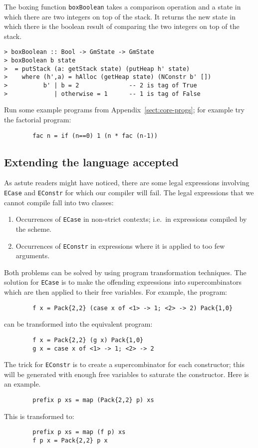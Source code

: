The boxing function \mbox{\tt boxBoolean} takes a comparison operation and a
state in which there are two integers on top of the stack. It returns
the new state in which there is the boolean result of comparing the
two integers on top of the stack.
\begin{verbatim}
> boxBoolean :: Bool -> GmState -> GmState
> boxBoolean b state
>  = putStack (a: getStack state) (putHeap h' state)
>    where (h',a) = hAlloc (getHeap state) (NConstr b' [])
>          b' | b = 2              -- 2 is tag of True
>             | otherwise = 1      -- 1 is tag of False
\end{verbatim}
%
%
\begin{exercise}\label{gm:X:fac6}
Run some example programs from Appendix~\ref{sect:core-progs}; for
example try the factorial program:
\begin{verbatim}
        fac n = if (n==0) 1 (n * fac (n-1))
\end{verbatim}
\end{exercise}

\subsection{Extending the language accepted}

As astute readers might have noticed, there are some legal expressions
involving \mbox{\tt ECase} and \mbox{\tt EConstr} for which our compiler will fail. The
legal expressions that we cannot compile fall into two classes:
\begin{enumerate}
\item Occurrences of \mbox{\tt ECase} in non-strict contexts; i.e.\ in
expressions compiled by the \tC{} scheme.

\item Occurrences of \mbox{\tt EConstr} in expressions where it is applied to
too few arguments.
\end{enumerate}
Both problems can be solved by using program transformation
techniques. The solution for \mbox{\tt ECase} is to make the offending
expressions into supercombinators which are then applied to their free
variables. For example, the program:
\begin{verbatim}
        f x = Pack{2,2} (case x of <1> -> 1; <2> -> 2) Pack{1,0}
\end{verbatim}
can be transformed into the equivalent program:
\begin{verbatim}
        f x = Pack{2,2} (g x) Pack{1,0}
        g x = case x of <1> -> 1; <2> -> 2
\end{verbatim}
The trick for \mbox{\tt EConstr} is to create a supercombinator for each
constructor; this will be generated with enough free variables to
saturate the constructor. Here is an example.
\begin{verbatim}
        prefix p xs = map (Pack{2,2} p) xs
\end{verbatim}
This is transformed to:
\begin{verbatim}
        prefix p xs = map (f p) xs
        f p x = Pack{2,2} p x
\end{verbatim}

